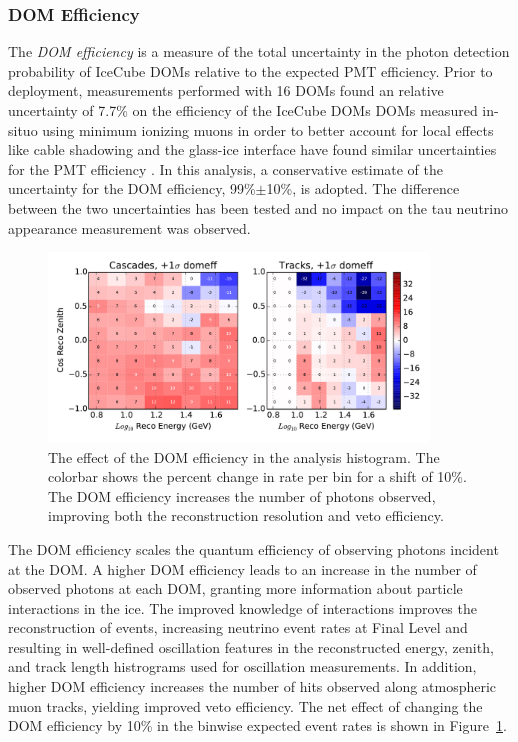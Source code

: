 \subsubsection{DOM Efficiency}
\label{subsubsec:domeff}
The \emph{DOM efficiency} is a measure of the total uncertainty in the photon detection probability of IceCube DOMs relative to the expected PMT efficiency.
Prior to deployment, measurements performed with 16 DOMs found an relative uncertainty of 7.7\% on the efficiency of the IceCube DOMs \cite{Description-IceCube}
DOMs measured in-situo using minimum ionizing muons in order to better account for local effects like cable shadowing and the glass-ice interface have found similar uncertainties for the PMT efficiency \cite{Thesis-Feintzeig}.
In this analysis, a conservative estimate of the uncertainty for the DOM efficiency, 99\%$\pm$10\%, is adopted.
The difference between the two uncertainties has been tested and no impact on the tau neutrino appearance measurement was observed.

\begin{figure}
\centering
\includegraphics[width=0.9\textwidth]{systematics/domeff_variation.pdf} 
\caption[Effect of the DOM efficiency in the analysis histogram]{The effect of the DOM efficiency in the analysis histogram. The colorbar shows the percent change in rate per bin for a shift of 10\%. The DOM efficiency increases the number of photons observed, improving both the reconstruction resolution and veto efficiency.}
\label{fig:systematics_domeff}
\end{figure}

The DOM efficiency scales the quantum efficiency of observing photons incident at the DOM.
A higher DOM efficiency leads to an increase in the number of observed photons at each DOM, granting more information about particle interactions in the ice.
The improved knowledge of interactions improves the reconstruction of events, increasing neutrino event rates at Final Level and resulting in well-defined oscillation features in the reconstructed energy, zenith, and track length histrograms used for oscillation measurements.
In addition, higher DOM efficiency increases the number of hits observed along atmospheric muon tracks, yielding improved veto efficiency.
The net effect of changing the DOM efficiency by 10\% in the binwise expected event rates is shown in Figure~\ref{fig:systematics_domeff}.

